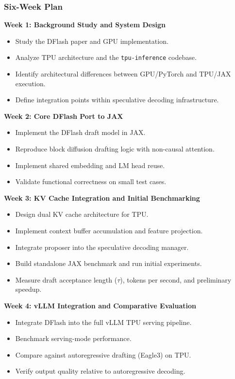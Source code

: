 \documentclass[12pt,letterpaper]{article}
\begin{document}
\subsubsection*{Six-Week Plan}

\textbf{Week 1: Background Study and System Design}

\begin{itemize}
    \item Study the DFlash paper and GPU implementation.
    \item Analyze TPU architecture and the \texttt{tpu-inference} codebase.
    \item Identify architectural differences between GPU/PyTorch and TPU/JAX execution.
    \item Define integration points within speculative decoding infrastructure.
\end{itemize}

\textbf{Week 2: Core DFlash Port to JAX}

\begin{itemize}
    \item Implement the DFlash draft model in JAX.
    \item Reproduce block diffusion drafting logic with non-causal attention.
    \item Implement shared embedding and LM head reuse.
    \item Validate functional correctness on small test cases.
\end{itemize}

\textbf{Week 3: KV Cache Integration and Initial Benchmarking}

\begin{itemize}
    \item Design dual KV cache architecture for TPU.
    \item Implement context buffer accumulation and feature projection.
    \item Integrate proposer into the speculative decoding manager.
    \item Build standalone JAX benchmark and run initial experiments.
    \item Measure draft acceptance length ($\tau$), tokens per second, and preliminary speedup.
\end{itemize}

\textbf{Week 4: vLLM Integration and Comparative Evaluation}

\begin{itemize}
    \item Integrate DFlash into the full vLLM TPU serving pipeline.
    \item Benchmark serving-mode performance.
    \item Compare against autoregressive drafting (Eagle3) on TPU.
    \item Verify output quality relative to autoregressive decoding.
\end{itemize}
\end{document}
